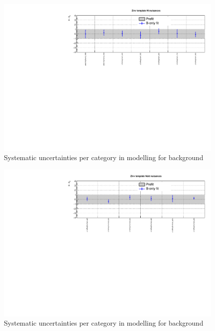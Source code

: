 \clearpage
\begin{figure}[h!]
  \centering
  \caption{Systematic uncertainties per \scalht category in \mht modelling for \znunuj background}
  \includegraphics[width=1.\linewidth]{figures/results/36invfb_freeze/postfit/nuis/TemplateZinv_ht_nuisances}
\end{figure}

\begin{figure}[h!]
  \centering
  \caption{Systematic uncertainties per \njet category in \mht modelling for \znunuj background}
  \includegraphics[width=1.\linewidth]{figures/results/36invfb_freeze/postfit/nuis/TemplateZinv_njet_nuisances}
\end{figure}

